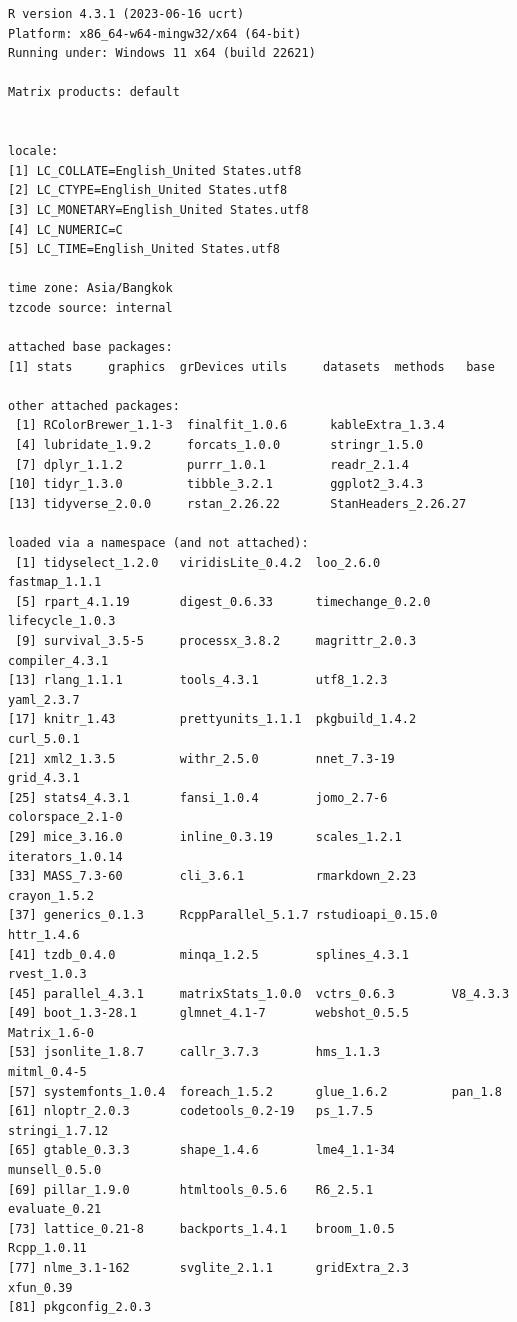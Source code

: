 \documentclass[
  letterpaper,
  DIV=11,
  numbers=noendperiod]{scrartcl}
\begin{document}
\begin{verbatim}
R version 4.3.1 (2023-06-16 ucrt)
Platform: x86_64-w64-mingw32/x64 (64-bit)
Running under: Windows 11 x64 (build 22621)

Matrix products: default


locale:
[1] LC_COLLATE=English_United States.utf8 
[2] LC_CTYPE=English_United States.utf8   
[3] LC_MONETARY=English_United States.utf8
[4] LC_NUMERIC=C                          
[5] LC_TIME=English_United States.utf8    

time zone: Asia/Bangkok
tzcode source: internal

attached base packages:
[1] stats     graphics  grDevices utils     datasets  methods   base     

other attached packages:
 [1] RColorBrewer_1.1-3  finalfit_1.0.6      kableExtra_1.3.4   
 [4] lubridate_1.9.2     forcats_1.0.0       stringr_1.5.0      
 [7] dplyr_1.1.2         purrr_1.0.1         readr_2.1.4        
[10] tidyr_1.3.0         tibble_3.2.1        ggplot2_3.4.3      
[13] tidyverse_2.0.0     rstan_2.26.22       StanHeaders_2.26.27

loaded via a namespace (and not attached):
 [1] tidyselect_1.2.0   viridisLite_0.4.2  loo_2.6.0          fastmap_1.1.1     
 [5] rpart_4.1.19       digest_0.6.33      timechange_0.2.0   lifecycle_1.0.3   
 [9] survival_3.5-5     processx_3.8.2     magrittr_2.0.3     compiler_4.3.1    
[13] rlang_1.1.1        tools_4.3.1        utf8_1.2.3         yaml_2.3.7        
[17] knitr_1.43         prettyunits_1.1.1  pkgbuild_1.4.2     curl_5.0.1        
[21] xml2_1.3.5         withr_2.5.0        nnet_7.3-19        grid_4.3.1        
[25] stats4_4.3.1       fansi_1.0.4        jomo_2.7-6         colorspace_2.1-0  
[29] mice_3.16.0        inline_0.3.19      scales_1.2.1       iterators_1.0.14  
[33] MASS_7.3-60        cli_3.6.1          rmarkdown_2.23     crayon_1.5.2      
[37] generics_0.1.3     RcppParallel_5.1.7 rstudioapi_0.15.0  httr_1.4.6        
[41] tzdb_0.4.0         minqa_1.2.5        splines_4.3.1      rvest_1.0.3       
[45] parallel_4.3.1     matrixStats_1.0.0  vctrs_0.6.3        V8_4.3.3          
[49] boot_1.3-28.1      glmnet_4.1-7       webshot_0.5.5      Matrix_1.6-0      
[53] jsonlite_1.8.7     callr_3.7.3        hms_1.1.3          mitml_0.4-5       
[57] systemfonts_1.0.4  foreach_1.5.2      glue_1.6.2         pan_1.8           
[61] nloptr_2.0.3       codetools_0.2-19   ps_1.7.5           stringi_1.7.12    
[65] gtable_0.3.3       shape_1.4.6        lme4_1.1-34        munsell_0.5.0     
[69] pillar_1.9.0       htmltools_0.5.6    R6_2.5.1           evaluate_0.21     
[73] lattice_0.21-8     backports_1.4.1    broom_1.0.5        Rcpp_1.0.11       
[77] nlme_3.1-162       svglite_2.1.1      gridExtra_2.3      xfun_0.39         
[81] pkgconfig_2.0.3   
\end{verbatim}
\end{document}
